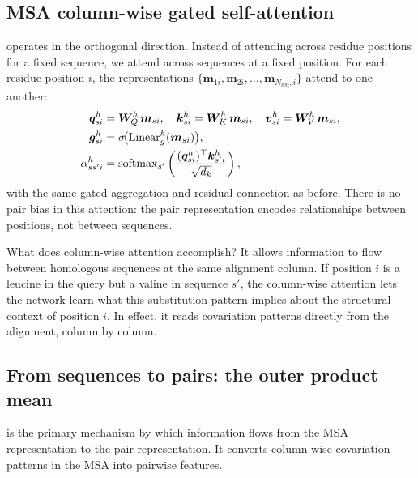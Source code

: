 \subsection*{MSA column-wise gated self-attention}
\label{sec:af2-col-attn}

 operates in the orthogonal direction.
Instead of attending across residue positions for a fixed sequence, we attend across sequences at a fixed position.
For each residue position $i$, the representations $\{\bm{m}_{1i}, \bm{m}_{2i}, \ldots, \bm{m}_{N_\text{seq},i}\}$ attend to one another:
\begin{align}
\bm{q}_{si}^h &= \bm{W}_Q^h\, \bm{m}_{si}, \quad
\bm{k}_{si}^h = \bm{W}_K^h\, \bm{m}_{si}, \quad
\bm{v}_{si}^h = \bm{W}_V^h\, \bm{m}_{si}, \label{eq:col-qkv} \\
\bm{g}_{si}^h &= \sigma\!\bigl(\text{Linear}_g^h(\bm{m}_{si})\bigr), \label{eq:col-gate} \\
\alpha_{ss'i}^h &= \operatorname{softmax}_{s'} \left( \frac{(\bm{q}_{si}^h)^\top \bm{k}_{s'i}^h}{\sqrt{d_k}} \right), \label{eq:col-attn-weights}
\end{align}
with the same gated aggregation and residual connection as before.
There is no pair bias in this attention: the pair representation encodes relationships between positions, not between sequences.

What does column-wise attention accomplish?
It allows information to flow between homologous sequences at the same alignment column.
If position $i$ is a leucine in the query but a valine in sequence $s'$, the column-wise attention lets the network learn what this substitution pattern implies about the structural context of position $i$.
In effect, it reads covariation patterns directly from the alignment, column by column.

\subsection*{From sequences to pairs: the outer product mean}
\label{sec:af2-opm}

 is the primary mechanism by which information flows from the MSA representation to the pair representation.
It converts column-wise covariation patterns in the MSA into pairwise features.

